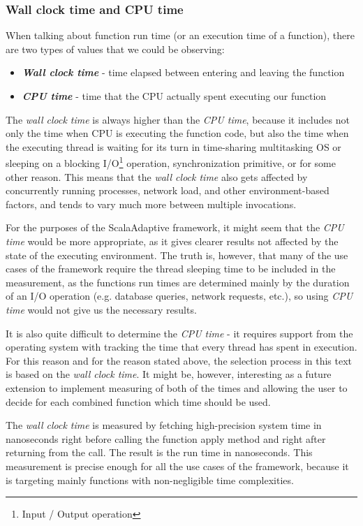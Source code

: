 \subsubsection{Wall clock time and CPU time}

When talking about function run time (or an execution time of a function), there are two types of values that we could be observing:

\begin{itemize}
	\item \textbf{\textit{Wall clock time}} - time elapsed between entering and leaving the function
	\item \textbf{\textit{CPU time}} - time that the CPU actually spent executing our function
\end{itemize}

The \textit{wall clock time} is always higher than the \textit{CPU time}, because it includes not only the time when CPU is executing the function code, but also the time when the executing thread is waiting for its turn in time-sharing multitasking OS or sleeping on a blocking I/O\footnote{Input / Output operation} operation, synchronization primitive, or for some other reason. This means that the \textit{wall clock time} also gets affected by concurrently running processes, network load, and other environment-based factors, and tends to vary much more between multiple invocations.

For the purposes of the ScalaAdaptive framework, it might seem that the \textit{CPU time} would be more appropriate, as it gives clearer results not affected by the state of the executing environment. The truth is, however, that many of the use cases of the framework require the thread sleeping time to be included in the measurement, as the functions run times are determined mainly by the duration of an I/O operation (e.g. database queries, network requests, etc.), so using \textit{CPU time} would not give us the necessary results.

It is also quite difficult to determine the \textit{CPU time} - it requires support from the operating system with tracking the time that every thread has spent in execution. For this reason and for the reason stated above, the selection process in this text is based on the \textit{wall clock time}. It might be, however, interesting as a future extension to implement measuring of both of the times and allowing the user to decide for each combined function which time should be used.

The \textit{wall clock time} is measured by fetching high-precision system time in nanoseconds right before calling the function apply method and right after returning from the call. The result is the run time in nanoseconds. This measurement is precise enough for all the use cases of the framework, because it is targeting mainly functions with non-negligible time complexities.

